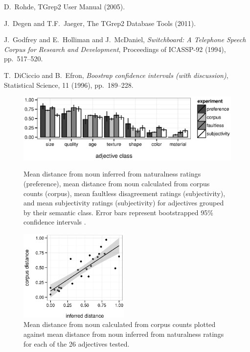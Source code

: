\documentclass{pnastwo}
\begin{document}
\begin{article}
\begin{thebibliography}{10}
	D.~Rohde, TGrep2 User Manual (2005).
	
	J.~Degen and T.F.~Jaeger, The TGrep2 Database Tools (2011).
	
	J.~Godfrey and E.~Holliman and J.~McDaniel, {\em Switchboard: A Telephone Speech Corpus for Research and Development}, Proceedings of ICASSP-92 (1994),
	pp.~517--520.
	
	T.~DiCiccio and B.~Efron, {\em Boostrap confidence intervals (with discussion)}, Statistical Science, 11 (1996), pp.~189--228.
\end{thebibliography}


\end{article}

\begin{figure}
	\centering
	{\includegraphics[width=.75\linewidth]{plots/expt_results.eps}}\par
	\caption{Mean distance from noun inferred from naturalness ratings (preference), mean distance from noun calculated from corpus counts (corpus),  mean faultless disagreement ratings (subjectivity), and mean subjectivity ratings (subjectivity) for adjectives grouped by their semantic class. Error bars represent bootstrapped 95\% confidence intervals \cite{diciccioefron1996}.}\label{results}
\end{figure}

\begin{figure}
	\centering\includegraphics[width=2.15in]{plots/corpus-naturalness.eps}
	\caption{Mean distance from noun calculated from corpus counts plotted against mean distance from noun inferred from naturalness ratings for each of the 26 adjectives tested.}\label{corpus-naturalness}
\end{figure}
\end{document}
